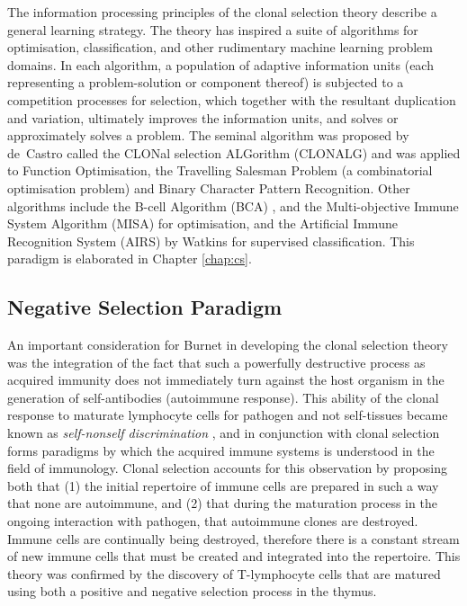 The information processing principles of the clonal selection theory describe a general learning strategy. The theory has inspired a suite of algorithms for optimisation, classification, and other rudimentary machine learning problem domains. In each algorithm, a population of adaptive information units (each representing a problem-solution or component thereof) is subjected to a competition processes for selection, which together with the resultant duplication and variation, ultimately improves the information units, and solves or approximately solves a problem. The seminal algorithm was proposed by de~Castro called the CLONal selection ALGorithm (CLONALG) \cite{Castro2000, Castro2002} and was applied to Function Optimisation, the Travelling Salesman Problem (a combinatorial optimisation problem) and Binary Character Pattern Recognition. Other algorithms include the B-cell Algorithm (BCA) \cite{Kelsey2003a, Kelsey2003}, and the Multi-objective Immune System Algorithm (MISA) \cite{Coello2002a, Cortes2003} for optimisation, and the Artificial Immune Recognition System (AIRS) by Watkins \cite{Watkins2002, Watkins2004a} for supervised classification. This paradigm is elaborated in Chapter \ref{chap:cs}.

%
%
\subsection{Negative Selection Paradigm}
\label{subsec:background:negativeselection}
An important consideration for Burnet in developing the clonal selection theory was the integration of the fact that such a powerfully destructive process as acquired immunity does not immediately turn against the host organism in the generation of self-antibodies (autoimmune response). This ability of the clonal response to maturate lymphocyte cells for pathogen and not self-tissues became known as \emph{self-nonself discrimination} \cite{Crist2000, Nossal1994}, and in conjunction with clonal selection forms paradigms by which the acquired immune systems is understood in the field of immunology. Clonal selection accounts for this observation by proposing both that (1) the initial repertoire of immune cells are prepared in such a way that none are autoimmune, and (2) that during the maturation process in the ongoing interaction with pathogen, that autoimmune clones are destroyed. Immune cells are continually being destroyed, therefore there is a constant stream of new immune cells that must be created and integrated into the repertoire. This theory was confirmed by the discovery of T-lymphocyte cells that are matured using both a positive and negative selection process in the thymus.


